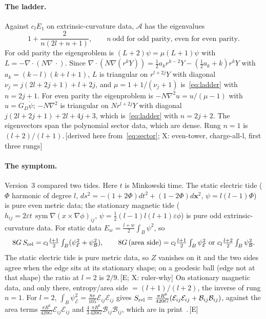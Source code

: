 \documentclass[11pt]{article}
\newcommand{\cE}{\mathcal{E}}
\newcommand{\cB}{\mathcal{B}}
\newcommand{\cA}{\mathcal{A}}
\newcommand{\sym}{\operatorname{sym}}
\newcommand{\Srel}{S_{\rm rel}}
\newcommand{\GD}{G_{\!D}}
\newcommand{\ev}[1]{\,{\textsf{\scriptsize[#1]}}}
\begin{document}
\paragraph{The ladder.} Against $c_lE_1$ on extrinsic-curvature data, $\cA$ has the eigenvalues
\begin{equation}\label{eq:ladder}
1+\frac{2}{n(2l+n+1)},\qquad n\ \text{odd for odd parity, even for even parity}.
\end{equation}
For odd parity the eigenproblem is $(L+2)\psi=\mu(L+1)\psi$ with $L=-\nabla\!\cdot(N\nabla\,\cdot)$. Since $\nabla\!\cdot(N\nabla(r^kY))=\frac12a_kr^{k-2}Y-(\frac12a_k+k)r^kY$ with $a_k=(k-l)(k+l+1)$, $L$ is triangular on $r^{l+2j}Y$ with diagonal $\nu_j=j(2l+2j+1)+l+2j$, and $\mu=1+1/(\nu_j+1)$ is~\eqref{eq:ladder} with $n=2j+1$. For even parity the eigenproblem is $-N\nabla^2u=u/(\mu-1)$ with $u=\GD\dot\psi$; $-N\nabla^2$ is triangular on $Nr^{l+2j}Y$ with diagonal $j(2l+2j+1)+2l+4j+3$, which is~\eqref{eq:ladder} with $n=2j+2$. The eigenvectors span the polynomial sector data, which are dense. Rung $n=1$ is $(l+2)/(l+1)$.\ev{derived here from~\eqref{eq:sector}; X: even-tower, charge-all-l, first three rungs}

\paragraph{The symptom.} Version~3 compared two tides. Here $t$ is Minkowski time. The static electric tide ($\Phi$ harmonic of degree $l$, $ds^2=-(1+2\Phi)dt^2+(1-2\Phi)d\mathbf x^2$, $\psi=l(l-1)\Phi$) is pure even metric data; the stationary magnetic tide ($h_{ij}=2\varepsilon t\,\sym\nabla(x\times\nabla\phi)_{ij}$, $\psi=\frac12(l-1)l(l+1)\varepsilon\phi$) is pure odd extrinsic-curvature data. For static data $E_w=\frac{l+w}2\int_B\psi^2$, so
\begin{equation}\label{eq:S}
8G\,\Srel=c_l\tfrac{l+1}2\textstyle\int_B(\psi_\cE^2+\psi_\cB^2),\qquad
8G\,(\text{area side})=c_l\tfrac{l+1}2\textstyle\int_B\psi_\cE^2\ \text{or}\ c_l\tfrac{l+2}2\textstyle\int_B\psi_\cB^2 .
\end{equation}
The static electric tide is pure metric data, so $Z$ vanishes on it and the two sides agree when the edge sits at its stationary shape; on a geodesic ball (edge not at that shape) the ratio at $l=2$ is $2/9$.\ev{E; X: ruler-why} On stationary magnetic data, and only there, entropy/area side $=(l+1)/(l+2)$, the inverse of rung $n=1$. For $l=2$, $\int_B\psi_\cE^2=\frac{8\pi}{105}\cE_{ij}\cE_{ij}$ gives $\Srel=\frac{\pi R^6}{420G}(\cE_{ij}\cE_{ij}+\cB_{ij}\cB_{ij})$, against the area terms $\frac{\pi R^6}{420G}\cE_{ij}\cE_{ij}$ and $\frac43\frac{\pi R^6}{420G}\cB_{ij}\cB_{ij}$, which are in print~\cite{JSS17}.\ev{E}
\end{document}
